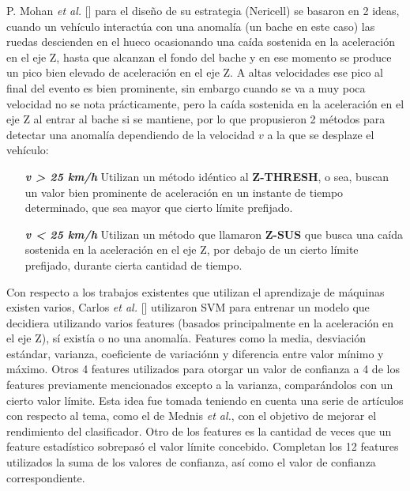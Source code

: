 P. Mohan {\it et al.} [] para el diseño de su estrategia (Nericell) se basaron en 2 ideas, cuando un vehículo interactúa con una anomalía (un bache en este caso) las ruedas descienden en el hueco ocasionando una caída sostenida en la aceleración en el eje Z, hasta que alcanzan el fondo del bache y en ese momento se produce un pico bien elevado de aceleración en el eje Z. A altas velocidades ese pico al final del evento es bien prominente, sin embargo cuando se va a muy poca velocidad no se nota prácticamente, pero la caída sostenida en la aceleración en el eje Z al entrar al bache si se mantiene, por lo que propusieron 2 métodos para detectar una anomalía dependiendo de la velocidad $v$ a la que se desplaze el vehículo:\\

\begin{enumerate}
	\item [ \textbf {\it v > 25 km/h} ] Utilizan un método idéntico al \textbf {Z-THRESH}, o sea, buscan un valor bien prominente de aceleración en un instante de tiempo determinado, que sea mayor que cierto límite prefijado.\\
	\item [ \textbf {\it v < 25 km/h} ] Utilizan un método que llamaron \textbf {Z-SUS} que busca una caída sostenida en la aceleración en el eje Z, por debajo de un cierto límite prefijado, durante cierta cantidad de tiempo.\\
\end{enumerate}

Con respecto a los trabajos existentes que utilizan el aprendizaje de máquinas existen varios, Carlos {\it et al.} [] utilizaron SVM para entrenar un modelo que decidiera utilizando varios features (basados principalmente en la aceleración en el eje Z), sí existía o no una anomalía. Features como la media, desviación estándar, varianza, coeficiente de variaciónn y diferencia entre valor mínimo y máximo. Otros 4 features utilizados para otorgar un valor de confianza a 4 de los features previamente mencionados excepto a la varianza, comparándolos con un cierto valor límite. Esta idea fue tomada teniendo en cuenta una serie de artículos con respecto al tema, como el de Mednis {\it et al.}, con el objetivo de mejorar el rendimiento del clasificador. Otro de los features es la cantidad de veces que un feature estadístico sobrepasó el valor límite concebido. Completan los 12 features utilizados la suma de los valores de confianza, así como el valor de confianza correspondiente.
